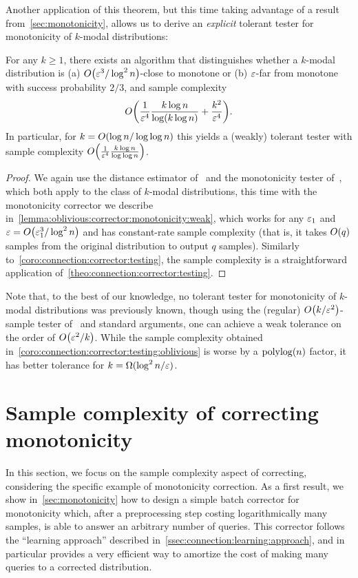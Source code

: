 Another application of this theorem, but this time taking advantage of a result from~\autoref{sec:monotonicity}, allows us to derive an \emph{explicit} tolerant tester for monotonicity of $k$-modal distributions:
\begin{corollary}\label{coro:connection:corrector:testing:oblivious}
For any $k\geq 1$, there exists an algorithm that distinguishes whether a $k$-modal distribution is  \textsf{(a)} $\bigO{\eps^3/\log^2 n}$-close to monotone or  \textsf{(b)} $\varepsilon$-far from monotone with success probability $2/3$, and sample complexity
\[
	\bigO{\frac{1}{\eps^4}\frac{k\log n}{\log (k\log n)} +\frac{k^2}{\eps^4} }.
\]
In particular, for $k=\bigO{\log n/\log\log n}$ this yields a (weakly) tolerant tester with sample complexity $\bigO{\frac{1}{\eps^4}\frac{k\log n}{\log\log n} }$.
\end{corollary}
\begin{proof}
 We again use the distance estimator of~\cite{DDSVV:13} and the monotonicity tester of~\cite{DDS:12}, which both apply to  the class of $k$-modal distributions, this time with the monotonicity corrector we describe in~\autoref{lemma:oblivious:corrector:monotonicity:weak}, which works for any $\varepsilon_1$ and $\eps=\bigO{\eps_1^3/\log^2 n}$ and has constant-rate sample complexity (that is, it takes $\bigO{q}$ samples from the original distribution to output $q$ samples). Similarly to~\autoref{coro:connection:corrector:testing}, the sample complexity is a straightforward application of~\autoref{theo:connection:corrector:testing}.
\end{proof}

Note that, to the best of our knowledge, no tolerant tester for 
monotonicity of $k$-modal distributions was previously known, 
though using the (regular) $\bigO{k/\eps^2}$-sample tester 
of~\cite{DDS:12} and standard arguments, one can achieve
a weak tolerance on the order of $\bigO{\eps^2/k}$. 
While the sample complexity obtained
in~\autoref{coro:connection:corrector:testing:oblivious} is 
worse by a $\operatorname*{poly}\!\log(n)$ factor, 
it has better tolerance for $k=\Omega(\log^2 n/\varepsilon)$.
\section{Sample complexity of correcting monotonicity}\label{sec:focus:samples}
	In this section, we focus on the sample complexity aspect of correcting, considering the specific example of monotonicity correction. As a first result, we show in~\autoref{sec:monotonicity} how to design a simple batch corrector for monotonicity which, after a preprocessing step costing logarithmically many samples, is able to answer an arbitrary number of queries. This corrector follows the ``learning approach'' described in~\autoref{ssec:connection:learning:approach}, and in particular provides a very efficient way to amortize the cost of making many queries to a corrected distribution.

